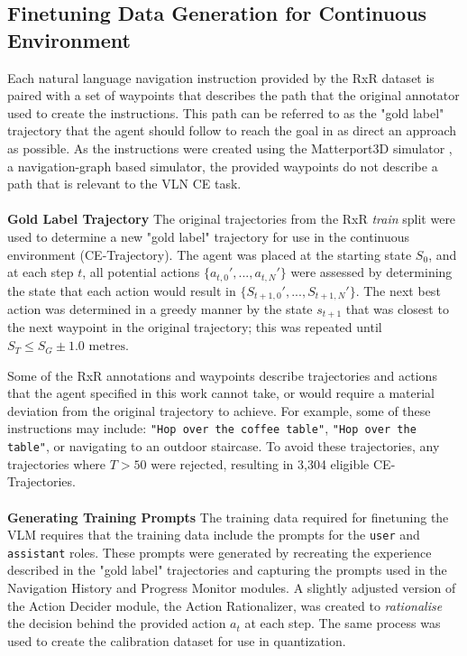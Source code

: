 \documentclass{svproc}
\begin{document}
\subsection{Finetuning Data Generation for Continuous Environment}
    Each natural language navigation instruction provided by the RxR dataset is paired with a set of waypoints that describes the path that the original annotator used to create the instructions. This path can be referred to as the "gold label" trajectory that the agent should follow to reach the goal in as direct an approach as possible. As the instructions were created using the Matterport3D simulator \cite{Matterport3D}, a navigation-graph based simulator, the provided waypoints do not describe a path that is relevant to the VLN CE task.
    \\ \\
    \textbf{Gold Label Trajectory}  The original trajectories from the RxR \textit{train} split were used to determine a new "gold label" trajectory for use in the continuous environment (CE-Trajectory). The agent was placed at the starting state $S_0$, and at each step $t$, all potential actions $\{a_{t,0}', ..., a_{t,N}'\}$ were assessed by determining the state that each action would result in $\{S_{t+1,0}', ..., S_{t+1,N}'\}$. The next best action was determined in a greedy manner by the state $s_{t+1}$ that was closest to the next waypoint in the original trajectory; this was repeated until $S_T \leq S_G \pm 1.0 \text{ metres}$.
    \par
    Some of the RxR annotations and waypoints describe trajectories and actions that the agent specified in this work cannot take, or would require a material deviation from the original trajectory to achieve. For example, some of these instructions may include: \texttt{"Hop over the coffee table"}, \texttt{"Hop over the table"}, or navigating to an outdoor staircase. To avoid these trajectories, any trajectories where $T > 50$ were rejected, resulting in 3,304 eligible CE-Trajectories.
    \\ \\
    \textbf{Generating Training Prompts}  The training data required for finetuning the VLM requires that the training data include the prompts for the \texttt{user} and \texttt{assistant} roles. These prompts were generated by recreating the experience described in the "gold label" trajectories and capturing the prompts used in the Navigation History and Progress Monitor modules. A slightly adjusted version of the Action Decider module, the Action Rationalizer, was created to \textit{rationalise} the decision behind the provided action $a_t$ at each step. The same process was used to create the calibration dataset for use in quantization.
\end{document}
